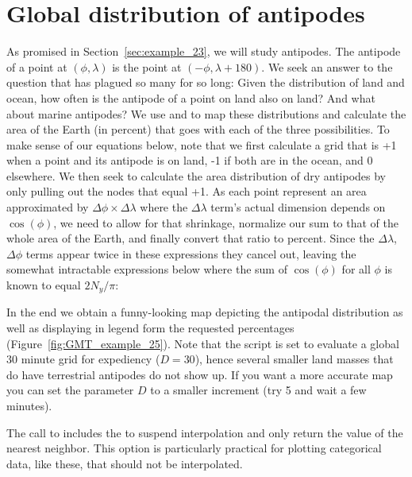 \section{Global distribution of antipodes}
\label{sec:example_25}

As promised in Section~\ref{sec:example_23}, we will study antipodes.  The antipode of a point at
$(\phi, \lambda)$ is the point at $(-\phi, \lambda + 180)$.  We seek an answer
to the question that has plagued so many for so long: Given the distribution of
land and ocean, how often is the antipode of a point on land also on land? And
what about marine antipodes?  We use  and 
to map these distributions and calculate the area of the Earth (in percent)
that goes with each of the three possibilities.  To make sense of our 
equations below, note that we first calculate a grid that is +1 when a point and its
antipode is on land, -1 if both are in the ocean, and 0 elsewhere.  We then
seek to calculate the area distribution of dry antipodes by only pulling out the nodes
that equal +1.  As each point represent an area approximated by $\Delta \phi \times \Delta \lambda$
where the $\Delta \lambda$ term's actual dimension depends on $\cos (\phi)$, we need
to allow for that shrinkage, normalize our sum to that of the whole area of the Earth,
and finally convert that ratio to percent.  Since the $\Delta \lambda$, $\Delta \phi$ terms
appear twice in these expressions they cancel out, leaving the somewhat
intractable expressions below where the sum of $\cos (\phi)$ for all $\phi$ is known to equal $2N_y / \pi$:


In the end we obtain a funny-looking map depicting the antipodal distribution as
well as displaying in legend form the requested percentages (Figure~\ref{fig:GMT_example_25}).
Note that the script is set to evaluate a global 30 minute grid for expediency ($D = 30$), hence
several smaller land masses that do have terrestrial antipodes do not show up.  If you want
a more accurate map you can set the parameter $D$ to a smaller increment (try 5 and wait a
few minutes).

The call to  includes the  to suspend interpolation and only
return the value of the nearest neighbor. This option is particularly practical for plotting
categorical data, like these, that should not be interpolated.


